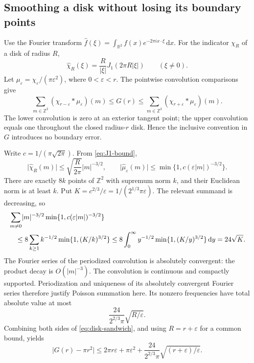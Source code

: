 \documentclass[11pt,reqno]{amsart}
\numberwithin{equation}{section}
\newcommand{\R}{\mathbb R}
\newcommand{\Z}{\mathbb Z}
\newcommand{\dd}{\,\mathrm d}
\newcommand{\abs}[1]{\lvert#1\rvert}
\begin{document}
\subsection*{Smoothing a disk without losing its boundary points}

Use the Fourier transform
$\widehat f(\xi)=\int_{\R^2}f(x)e^{-2\pi i x\cdot\xi}\dd x$.
For the indicator $\chi_R$ of a disk of radius $R$,
\[
 \widehat\chi_R(\xi)=\frac{R}{\abs\xi}J_1(2\pi R\abs\xi)
 \qquad(\xi\ne0).
\]
Let $\mu_\varepsilon=\chi_\varepsilon/(\pi\varepsilon^2)$,
where $0<\varepsilon<r$. The pointwise convolution comparisons
give
\begin{equation}\label{eq:disk-sandwich}
 \sum_{m\in\Z^2}(\chi_{r-\varepsilon}*\mu_\varepsilon)(m)
 \le G(r)\le
 \sum_{m\in\Z^2}(\chi_{r+\varepsilon}*\mu_\varepsilon)(m).
\end{equation}
The lower convolution is zero at an exterior tangent point;
the upper convolution equals one throughout the closed
radius-$r$ disk. Hence the inclusive convention in $G$
introduces no boundary error.

Write $c=1/(\pi\sqrt{2\pi})$. From \eqref{eq:J1-bound},
\[
 \abs{\widehat\chi_R(m)}\le\sqrt{\frac{R}{2\pi}}\abs m^{-3/2},
 \qquad
 \abs{\widehat\mu_\varepsilon(m)}
 \le\min\{1,c(\varepsilon\abs m)^{-3/2}\}.
\]
There are exactly $8k$ points of $\Z^2$ with supremum norm
$k$, and their Euclidean norm is at least $k$. Put
$K=c^{2/3}/\varepsilon=1/(2^{1/3}\pi\varepsilon)$.
The relevant summand is decreasing, so
\begin{align}
 &\sum_{m\ne0}\abs m^{-3/2}
             \min\{1,c(\varepsilon\abs m)^{-3/2}\}\notag\\
 &\quad\le8\sum_{k\ge1}k^{-1/2}\min\{1,(K/k)^{3/2}\}
 \le8\int_0^\infty y^{-1/2}\min\{1,(K/y)^{3/2}\}\dd y
 =24\sqrt K.\label{eq:lattice-shell}
\end{align}
The Fourier series of the periodized convolution is
absolutely convergent: the product decay is $O(\abs m^{-3})$.
The convolution is continuous and compactly supported.
Periodization and uniqueness of its absolutely convergent
Fourier series therefore justify Poisson summation here.
Its nonzero frequencies have total absolute value at most
\[
 \frac{24}{2^{2/3}\pi}\sqrt{R/\varepsilon}.
\]
Combining both sides of \eqref{eq:disk-sandwich}, and using
$R=r+\varepsilon$ for a common bound, yields
\begin{equation}\label{eq:disk-error}
 \abs{G(r)-\pi r^2}\le
 2\pi r\varepsilon+\pi\varepsilon^2
 +\frac{24}{2^{2/3}\pi}\sqrt{(r+\varepsilon)/\varepsilon}.
\end{equation}
\end{document}
